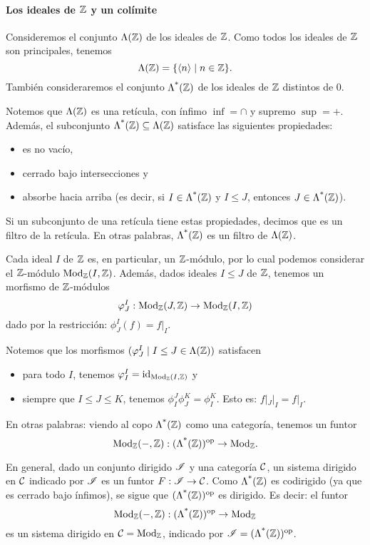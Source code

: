 \paragraph{Los ideales de $\Z$ y un colímite}
Consideremos el conjunto $\Lambda(\Z)$ de los ideales de $\Z$.
Como todos los ideales de $\Z$ son principales, tenemos
\[
    \Lambda(\Z)=\{\<n\>\mid n\in \Z\}
.\]
También consideraremos el conjunto $\nti\Z$
de los ideales de $\Z$ distintos de $0$.

Notemos que $\Lambda(\Z)$ es una retícula, con ínfimo $\inf=\cap$
y supremo $\sup=+$.
Además, el subconjunto $\nti\Z\subseteq\Lambda(\Z)$
satisface las siguientes propiedades:
\begin{itemize}
    \item es no vacío,
    \item cerrado bajo intersecciones y
    \item absorbe hacia arriba
    (es decir, si $I\in\nti\Z$ y $I\leq J$,
    entonces $J\in\nti\Z$).
\end{itemize}
Si un subconjunto de una retícula tiene estas propiedades,
decimos que es un filtro de la retícula.
En otras palabras, $\nti\Z$ es un filtro de $\Lambda(\Z)$.

Cada ideal $I$ de $\Z$ es, en particular, un $\Z$-módulo,
por lo cual podemos considerar el $\Z$-módulo $\Mod_\Z(I,\Z)$.
Además, dados ideales $I\leq J$ de $\Z$,
tenemos un morfismo de $\Z$-módulos
\[
    \phi^I_J:\Mod_\Z(J,\Z)\to\Mod_\Z(I,\Z)
\]
dado por la restricción: $\phi^I_J(f)=f|_I$.

Notemos que los morfismos $(\phi^I_J\mid I\leq J\in\Lambda(\Z))$
satisfacen
\begin{itemize}
    \item para todo $I$, tenemos $\phi^I_I=\id_{\Mod_\Z(I,\Z)}$ y
    \item siempre que $I\leq J\leq K$, tenemos
    $\phi^J_I\phi^K_J=\phi^K_I$. Esto es: $f|_J|_I=f|_I$.
\end{itemize}

En otras palabras: viendo al copo $\nti\Z$
como una categoría, tenemos un funtor
\[
    \Mod_\Z(-,\Z):(\nti\Z)^\op\to\Mod_\Z
.\]

En general, dado un conjunto dirigido $\scr I$
y una categoría $\cal C$,
un sistema dirigido en $\cal C$ indicado por $\scr I$
es un funtor $F:\scr I\to\cal C$.
Como $\nti\Z$ es codirigido (ya que es cerrado bajo ínfimos),
se sigue que $(\nti\Z)^\op$ es dirigido.
Es decir: el funtor
\[
    \Mod_\Z(-,\Z):(\nti\Z)^\op\to\Mod_\Z
\]
es un sistema dirigido en $\cal C=\Mod_\Z$,
indicado por $\scr I = (\nti\Z)^\op$.

